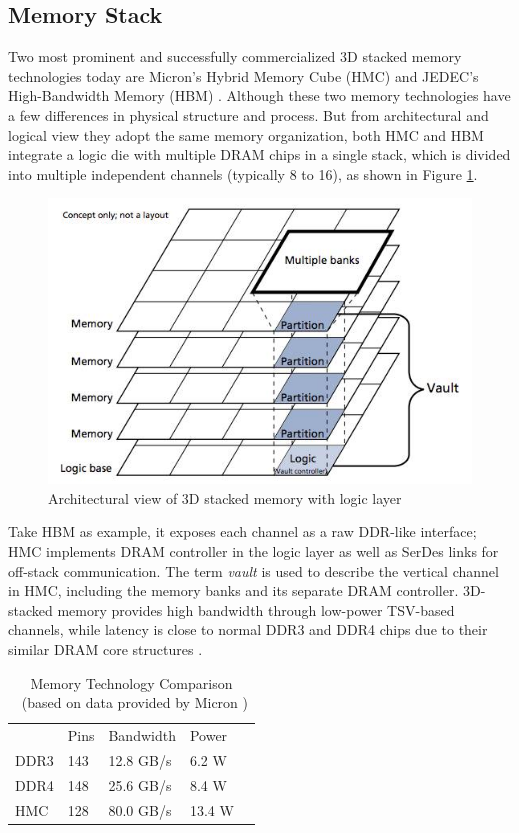 \documentclass[letterpaper, 11pt, conference, margin=1in]{ieeeconf}   %
\begin{document}
\subsection{\bf Memory Stack}
Two most prominent and successfully commercialized 3D stacked memory technologies today are Micron's Hybrid Memory Cube (HMC) \cite{HMC-2.1} and JEDEC's High-Bandwidth Memory (HBM) \cite{HBM}. Although these two memory technologies have a few differences in physical structure and process. But from architectural and logical view they adopt the same memory organization, both HMC and HBM integrate a logic die with multiple DRAM chips in a single stack, which is divided into multiple independent channels (typically 8 to 16), as shown in Figure \ref{fig:3dstack}.

\begin{figure}[h]
	\centering
  \includegraphics[scale=0.3]{hmc_concept.jpg}
  \caption{Architectural view of 3D stacked memory with logic layer}
  \label{fig:3dstack}
\end{figure}

Take HBM as example, it exposes each channel as a raw DDR-like interface; HMC implements DRAM controller in the logic layer as well as SerDes links for off-stack communication. The term \textit{vault} is used to describe the vertical channel in HMC, including the memory banks and its separate DRAM controller. 3D-stacked memory provides high bandwidth through low-power TSV-based channels, while latency is close to normal DDR3 and DDR4 chips due to their similar DRAM core structures \cite{6757501}.

\begin{table}[h]
\centering
\caption{Memory Technology Comparison \
        (based on data provided by Micron \cite{HMC-1.0})}
\label{tab:table1}
\begin{tabular}{|l|l|l|l|l}
\cline{1-4}
     & Pins & Bandwidth & Power  &  \\ \cline{1-4}
DDR3 & 143  & 12.8 GB/s & 6.2 W  &  \\ \cline{1-4}
DDR4 & 148  & 25.6 GB/s & 8.4 W  &  \\ \cline{1-4}
HMC  & 128  & 80.0 GB/s & 13.4 W &  \\ \cline{1-4}
\end{tabular}
\end{table}
\end{document}
